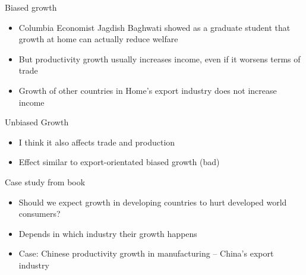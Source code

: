 \documentclass[ignorenonframetext,]{beamer}
\begin{document}
\begin{frame}{Biased growth}

    \begin{itemize}
        \item Columbia Economist Jagdish Baghwati showed as a graduate student that growth at home can actually reduce welfare
        \item But productivity growth usually increases income, even if it worsens terms of trade
        \item Growth of other countries in Home's export industry does not increase income 
    \end{itemize}

\end{frame}

\begin{frame}{Unbiased Growth}

    \begin{itemize}
        \item I think it also affects trade and production
        \item Effect similar to export-orientated biased growth (bad)
    \end{itemize}

\end{frame}

\begin{frame}{Case study from book}

    \begin{itemize}
        \item Should we expect growth in developing countries to hurt developed world consumers?
        \item Depends in which industry their growth happens
        \item Case: Chinese productivity growth in manufacturing -- China's export industry
    \end{itemize}

\end{frame}
\end{document}
